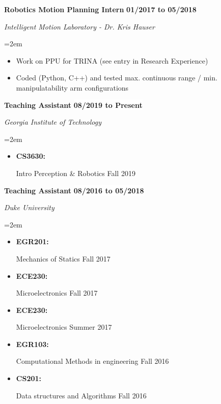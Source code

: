 \documentclass[paper=letter,fontsize=11pt]{scrartcl} %
\newcommand{\sepspace}{\vspace*{0em}}		%
\newcommand{\EducationEntry}[4]{
		\noindent \textbf{#1} \hfill      %
		\colorbox{White}{%
			\bf 
			\parbox{10em}{%
			\hfill\color{Black}#2}} \par  %
		\noindent \textit{#3} \par        %
		\noindent\hangindent=2em\hangafter=0 \small #4 %
		\normalsize \par}
\newcommand{\WorkEntry}[4]{				  %
		\noindent \textbf{#1} \hfill      %
		\colorbox{White}{\bf \color{Black}#2} \par  %
		\noindent \textit{#3} \par              %
		\noindent\hangindent=2em\hangafter=0 \small #4 %
		\normalsize \par}
\begin{document}
\WorkEntry{Robotics Motion Planning Intern}{01/2017 to 05/2018}{Intelligent Motion Laboratory - Dr. Kris Hauser}{
	\begin{itemize}
	\item Work on PPU for TRINA (see entry in Research Experience)
	\item Coded (Python, C++) and tested max. continuous range / min. manipulatability arm configurations
	\end{itemize}
}

\sepspace
\WorkEntry{Teaching Assistant}{08/2019 to Present}{Georgia Institute of Technology}
{
	\begin{itemize}
		\item \parbox[t]{4.5em}{\bf CS3630:} Intro Perception \& Robotics \hfill Fall 2019
	\end{itemize}
}

\sepspace
\WorkEntry{Teaching Assistant}{08/2016 to 05/2018}{Duke University}
{
	\begin{itemize}
		\item \parbox[t]{4.5em}{\bf EGR201:} Mechanics of Statics \hfill Fall 2017
		\item \parbox[t]{4.5em}{\bf ECE230:} Microelectronics	\hfill Fall 2017
		\item \parbox[t]{4.5em}{\bf ECE230:} Microelectronics	\hfill Summer 2017
		\item \parbox[t]{4.5em}{\bf EGR103:} Computational Methods in engineering 	\hfill Fall 2016
		\item \parbox[t]{4.5em}{\bf CS201: } Data structures and Algorithms 	\hfill Fall 2016
	\end{itemize}
}
\end{document}
